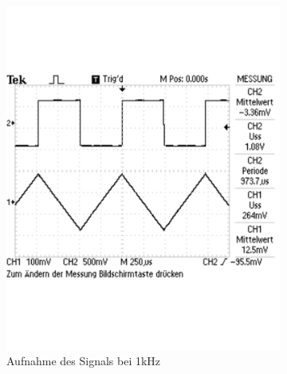 \documentclass[12pt,a4paper]{article}
\begin{document}
\begin{figure}[H]
\begin{subfigure}[b]{0.28\textwidth}
                \includegraphics[width=\textwidth , scale = 0.4]{2_6_recht_1k.pdf}
                \caption[Aufnahme des Signals bei 1kHz]{Aufnahme des Signals bei 1kHz}
                \label{fig:2_6_recht_1k}
        \end{subfigure}
        \hfill
        \begin{subfigure}[b]{0.28\textwidth}

\end{subfigure}
\end{figure}
\end{document}
